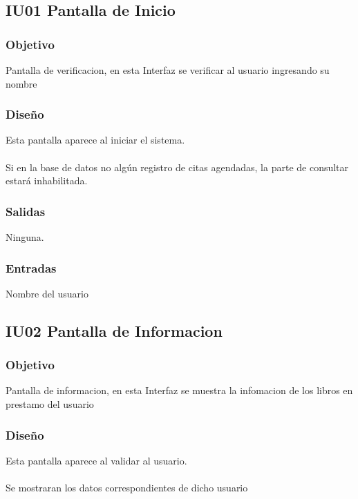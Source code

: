 \newpage
\subsection{IU01 Pantalla de Inicio}

\subsubsection{Objetivo}
	Pantalla de verificacion, en esta Interfaz se verificar al usuario ingresando su nombre  

\subsubsection{Diseño}
	Esta pantalla aparece al iniciar el sistema.  \\\\
	Si en la base de datos no algún registro de citas agendadas, la parte de consultar estará inhabilitada. 


\subsubsection{Salidas}
	\begin{Citemize}
		\item Ninguna. 
	\end{Citemize}
	
\subsubsection{Entradas}
	\begin{Citemize}
		\item Nombre del usuario 
	\end{Citemize}

\subsection{IU02 Pantalla de Informacion}

\subsubsection{Objetivo}
	Pantalla de informacion, en esta Interfaz se muestra la infomacion de los libros en prestamo del usuario  

\subsubsection{Diseño}
	Esta pantalla aparece al validar al usuario.  \\\\
	Se mostraran los datos correspondientes de dicho usuario


